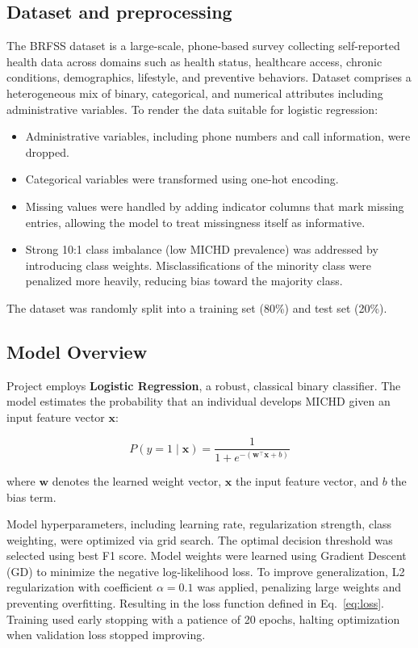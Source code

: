 \documentclass[10pt,conference,compsocconf]{IEEEtran}
\begin{document}
\subsection{Dataset and preprocessing}
The BRFSS dataset is a large-scale, phone-based survey collecting self-reported health data across domains such as health status, healthcare access, chronic conditions, demographics, lifestyle, and preventive behaviors.
Dataset comprises a heterogeneous mix of binary, categorical, and numerical attributes including administrative variables.
To render the data suitable for logistic regression:
\begin{itemize}
    \item Administrative variables, including phone numbers and call information, were dropped.
    \item Categorical variables were transformed using one-hot encoding.
    \item Missing values were handled by adding indicator columns that mark missing entries, allowing the model to treat missingness itself as informative. 
    \item Strong 10:1 class imbalance (low MICHD prevalence) was addressed by introducing class weights. Misclassifications of the minority class were penalized more heavily, reducing bias toward the majority class.   
\end{itemize}
The dataset was randomly split into a training set (80\%) and test set (20\%). 

\subsection{Model Overview}
Project employs \textbf{Logistic Regression}, a robust, classical binary classifier. The model estimates the probability that an individual develops MICHD given an input feature vector $\bm{x}$:

\begin{equation}
P(y = 1 \mid \bm{x}) = \frac{1}{1 + e^{-(\bm{w}^\top \bm{x} + b)}}
\end{equation}

where $\bm{w}$ denotes the learned weight vector, $\bm{x}$ the input feature vector, and $b$ the bias term.

Model hyperparameters, including learning rate, regularization strength, class weighting, were optimized via grid search. The optimal decision threshold was selected using best F1 score. Model weights were learned using Gradient Descent (GD) to minimize the negative log-likelihood loss. To improve generalization, L2 regularization with coefficient $\alpha = 0.1$ was applied, penalizing large weights and preventing overfitting. Resulting in the loss function defined in Eq.~\ref{eq:loss}. Training used early stopping with a patience of 20 epochs, halting optimization when validation loss stopped improving. 
\end{document}
